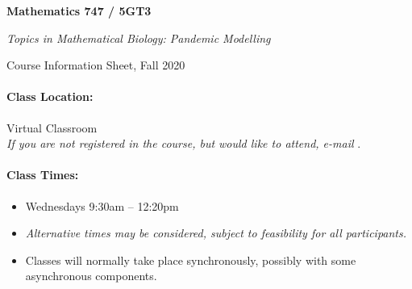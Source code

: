 \documentclass[12pt]{article}
\begin{document}

{\Large\parindent=0pt

{\bfseries Mathematics 747 / 5GT3}

{\slshape Topics in Mathematical Biology: Pandemic Modelling}

Course Information Sheet, Fall 2020

}

\bigskip



\paragraph*{Class Location:} Virtual Classroom\\
\emph{If you are not registered in the course, but would like to
  attend, e-mail} \texttt{\myemaillink}.

\paragraph*{Class Times:}
\begin{itemize}%
\item Wednesdays 9:30am -- 12:20pm
\item {\slshape Alternative times may be considered, subject to
    feasibility for all participants.}
\item Classes will normally take place synchronously, possibly with
  some asynchronous components.
\end{itemize}
\end{document}
